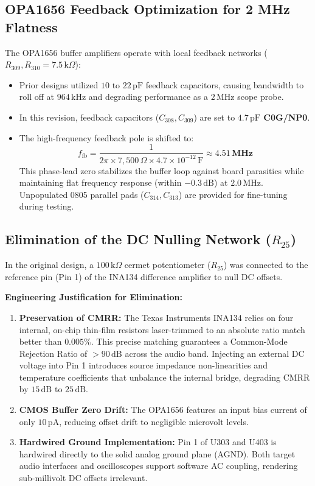 \documentclass[11pt, letterpaper]{article}
\begin{document}
\subsection{OPA1656 Feedback Optimization for 2 MHz Flatness}
The OPA1656 buffer amplifiers operate with local feedback networks ($R_{309}, R_{310} = 7.5\,\text{k}\Omega$):
\begin{itemize}[leftmargin=1.5em]
    \item Prior designs utilized $10\text{ to }22\,\text{pF}$ feedback capacitors, causing bandwidth to roll off at $964\,\text{kHz}$ and degrading performance as a $2\,\text{MHz}$ scope probe.
    \item In this revision, feedback capacitors ($C_{308}, C_{309}$) are set to \textbf{$4.7\,\text{pF}$ C0G/NP0}.
    \item The high-frequency feedback pole is shifted to:
    \begin{equation}
        f_{\text{fb}} = \frac{1}{2 \pi \times 7{,}500\,\Omega \times 4.7 \times 10^{-12}\,\text{F}} \approx \mathbf{4.51\,\text{MHz}}
    \end{equation}
    This phase-lead zero stabilizes the buffer loop against board parasitics while maintaining flat frequency response (within $-0.3\,\text{dB}$) at $2.0\,\text{MHz}$. Unpopulated 0805 parallel pads ($C_{314}, C_{313}$) are provided for fine-tuning during testing.
\end{itemize}

\subsection{Elimination of the DC Nulling Network \texorpdfstring{($R_{25}$)}{(R25)}}
In the original design, a $100\,\text{k}\Omega$ cermet potentiometer ($R_{25}$) was connected to the reference pin (Pin 1) of the INA134 difference amplifier to null DC offsets. 

\textbf{Engineering Justification for Elimination:}
\begin{enumerate}[label=\textbf{\arabic*.}]
    \item \textbf{Preservation of CMRR:} The Texas Instruments INA134 relies on four internal, on-chip thin-film resistors laser-trimmed to an absolute ratio match better than $0.005\%$. This precise matching guarantees a Common-Mode Rejection Ratio of $>90\,\text{dB}$ across the audio band. Injecting an external DC voltage into Pin 1 introduces source impedance non-linearities and temperature coefficients that unbalance the internal bridge, degrading CMRR by $15\,\text{dB}$ to $25\,\text{dB}$.
    \item \textbf{CMOS Buffer Zero Drift:} The OPA1656 features an input bias current of only $10\,\text{pA}$, reducing offset drift to negligible microvolt levels.
    \item \textbf{Hardwired Ground Implementation:} Pin 1 of U303 and U403 is hardwired directly to the solid analog ground plane (AGND). Both target audio interfaces and oscilloscopes support software AC coupling, rendering sub-millivolt DC offsets irrelevant.
\end{enumerate}
\end{document}
